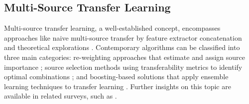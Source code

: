 \documentclass[letterpaper]{article} %
\begin{document}



\subsection{Multi-Source Transfer Learning}\label{sec:multisource}



Multi-source transfer learning, a well-established concept, encompasses approaches like naive multi-source transfer by feature extractor concatenation \citep{christodoulidis2016multisource} and theoretical explorations \citep{crammer2008learning, mansour2008domain, ben2010theory, tong2021mathematical, chen2023algorithm}. Contemporary algorithms can be classified into three main categories: re-weighting approaches that estimate and assign source importance \citep{sun2011two, lee2019learning, shui2021aggregating}; source selection methods using transferability metrics to identify optimal combinations \citep{agostinelli2022transferability}; and boosting-based solutions that apply ensemble learning techniques to transfer learning \citep{huang2012boosting, xu2012multi, fang2019adapted}. Further insights on this topic are available in related surveys, such as \citep{sun2015survey}.
\end{document}
